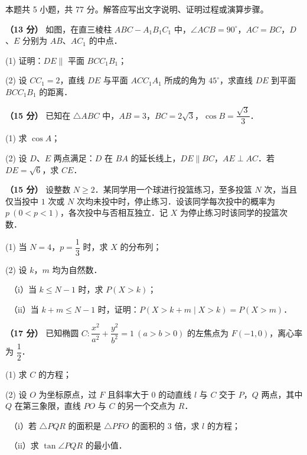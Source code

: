 \begin{gktip}
本题共 5 小题，共 77 分。解答应写出文字说明、证明过程或演算步骤。
\end{gktip}

\Needspace{0.4\textheight}
\begin{question}
\textbf{（13 分）} 如图，在直三棱柱 $ABC-A_1B_1C_1$ 中，$\angle ACB=90^\circ$，$AC=BC$，$D$、$E$ 分别为 $AB$、$AC_1$ 的中点．
\nopagebreak[4]
\begin{center}\end{center}
\nopagebreak[4]
  (1) 证明：$DE\parallel$ 平面 $BCC_1B_1$；

  (2) 设 $CC_1=2$，直线 $DE$ 与平面 $ACC_1A_1$ 所成的角为 $45^\circ$，求直线 $DE$ 到平面 $BCC_1B_1$ 的距离．

\end{question}
\begin{question}
\textbf{（15 分）} 已知在 $\triangle ABC$ 中，$AB=3$，$BC=2\sqrt{3}$，$\cos B=\dfrac{\sqrt{3}}{3}$．

  (1) 求 $\cos A$；

  (2) 设 $D$、$E$ 两点满足：$D$ 在 $BA$ 的延长线上，$DE\parallel BC$，$AE\perp AC$．若 $DE=\sqrt{6}$，求 $CE$．

\end{question}
\begin{question}
\textbf{（15 分）} 设整数 $N\ge 2$．某同学用一个球进行投篮练习，至多投篮 $N$ 次，当且仅当投中 $1$ 次或 $N$ 次均未投中时，停止练习．设该同学每次投中的概率为 $p\ (0<p<1)$，各次投中与否相互独立．记 $X$ 为停止练习时该同学的投篮次数．

  (1) 当 $N=4$，$p=\dfrac{1}{3}$ 时，求 $X$ 的分布列；

  (2) 设 $k$，$m$ 均为自然数．

  　（i）当 $k\le N-1$ 时，求 $P(X>k)$；

  　（ii）当 $k+m\le N-1$ 时，证明：$P(X>k+m\mid X>k)=P(X>m)$．

\end{question}
\begin{question}
\textbf{（17 分）} 已知椭圆 $C:\dfrac{x^2}{a^2}+\dfrac{y^2}{b^2}=1\ (a>b>0)$ 的左焦点为 $F(-1,0)$，离心率为 $\dfrac{1}{2}$．

  (1) 求 $C$ 的方程；

  (2) 设 $O$ 为坐标原点，过 $F$ 且斜率大于 $0$ 的动直线 $l$ 与 $C$ 交于 $P$，$Q$ 两点，其中 $Q$ 在第三象限，直线 $PO$ 与 $C$ 的另一个交点为 $R$．

  　（i）若 $\triangle PQR$ 的面积是 $\triangle PFO$ 的面积的 $3$ 倍，求 $l$ 的方程；

  　（ii）求 $\tan\angle PQR$ 的最小值．

\end{question}
